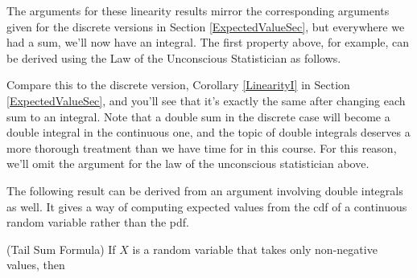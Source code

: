 \par
The arguments for these linearity results mirror the corresponding arguments given for the discrete versions in Section \ref{ExpectedValueSec}, but everywhere we had a sum, we'll now have an integral. The first property above, for example, can be derived using the Law of the Unconscious Statistician as follows.
\par
Compare this to the discrete version, Corollary \ref{LinearityI} in Section \ref{ExpectedValueSec}, and you'll see that it's exactly the same after changing each sum to an integral. Note that a double sum in the discrete case will become a double integral in the continuous one, and the topic of double integrals deserves a more thorough treatment than we have time for in this course. For this reason, we'll omit the argument for the law of the unconscious statistician above.
\par
The following result can be derived from an argument involving double integrals as well. It gives a way of computing expected values from the cdf of a continuous random variable rather than the pdf.
\par
\begin{prop}\label{Tail Sum Formula}(Tail Sum Formula) If $X$ is a random variable that takes only non-negative values, then
\end{prop}

